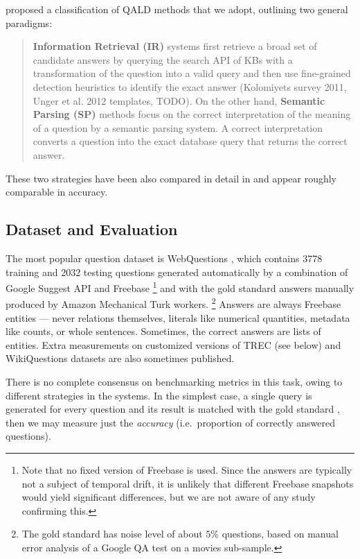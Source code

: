 \citep{Semantic2014Bordes} proposed a classification of QALD methods
that we adopt, outlining two general paradigms:

\begin{quote}
\textbf{Information
Retrieval (IR)} systems first retrieve a broad set of candidate answers by querying
the search API of KBs with a transformation of the question into a valid
query and then use fine-grained detection heuristics to identify the exact answer
(Kolomiyets survey 2011, Unger et al. 2012 templates, \citep{TreeFreebase2014Yao} TODO).
On the other hand, \textbf{Semantic Parsing (SP)} methods focus on the correct
interpretation of the meaning of a question by a semantic parsing system. A
correct interpretation converts a question into the exact database query that
returns the correct answer. \citep{Semantic2013Berant, SPBerant2014Paraphrase, OQA}
\end{quote}

These two strategies have been also compared in detail in \cite{FreebaseQA2014Yao}
and appear roughly comparable in accuracy.

\subsection{Dataset and Evaluation}

The most popular question dataset is WebQuestions \citep{WebQuestions},
which contains 3778 training and 2032 testing questions generated
automatically by a combination of Google Suggest API and Freebase%
\footnote{Note that no fixed version of Freebase is used.
	Since the answers are typically not a subject of temporal drift,
	it is unlikely that different Freebase snapshots would yield
	significant differences, but we are not aware of any study confirming this.}
and with the gold standard answers manually produced by Amazon Mechanical Turk workers.%
\footnote{The gold standard has noise level of about $5\%$ questions,
	based on manual error analysis of a Google QA test on a movies sub-sample.}
Answers are always Freebase entities --- never relations themselves,
literals like numerical quantities, metadata like counts, or whole sentences.
Sometimes, the correct answers are lists of entities.
Extra measurements on customized versions of TREC (see below) and WikiQuestions
datasets are also sometimes published.

There is no complete consensus on benchmarking metrics in this task,
owing to different strategies in the systems.
In the simplest case, a single query is generated for every question
and its result is matched with the gold standard
\citep{Semantic2013Berant}, then we may measure just the \textit{accuracy}
(i.e.\ proportion of correctly answered questions).

